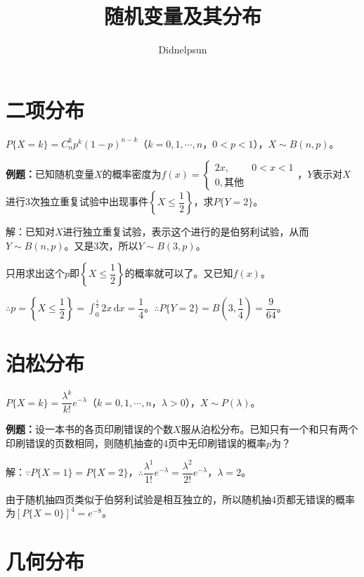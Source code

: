\documentclass[UTF8, 12pt]{ctexart}
\author{Didnelpsun}
\title{随机变量及其分布}
\date{}
\begin{document}
\maketitle
\pagestyle{empty}
\thispagestyle{empty}
\tableofcontents
\thispagestyle{empty}
\newpage
\pagestyle{plain}
\setcounter{page}{1}

\section{二项分布}

$P\{X=k\}=C_n^kp^k(1-p)^{n-k}$（$k=0,1,\cdots,n$，$0<p<1$），$X\sim B(n,p)$。

\textbf{例题：}已知随机变量$X$的概率密度为$f(x)=\left\{\begin{array}{ll}
    2x, & 0<x<1 \\
    0, \text{其他}
\end{array}\right.$，$Y$表示对$X$进行3次独立重复试验中出现事件$\left\{X\leqslant\dfrac{1}{2}\right\}$，求$P\{Y=2\}$。\medskip

解：已知对$X$进行独立重复试验，表示这个进行的是伯努利试验，从而$Y\sim B(n,p)$。又是3次，所以$Y\sim B(3,p)$。

只用求出这个$p$即$\left\{X\leqslant\dfrac{1}{2}\right\}$的概率就可以了。又已知$f(x)$。

$\therefore p=\left\{X\leqslant\dfrac{1}{2}\right\}=\int_0^\frac{1}{2}2x\,\textrm{d}x=\dfrac{1}{4}$。$\therefore P\{Y=2\}=B\left(3,\dfrac{1}{4}\right)=\dfrac{9}{64}$。

\section{泊松分布}

$P\{X=k\}=\dfrac{\lambda^k}{k!}e^{-\lambda}$（$k=0,1,\cdots,n$，$\lambda>0$），$X\sim P(\lambda)$。

\textbf{例题：}设一本书的各页印刷错误的个数$X$服从泊松分布。已知只有一个和只有两个印刷错误的页数相同，则随机抽查的4页中无印刷错误的概率$p$为？

解：$\because P\{X=1\}=P\{X=2\}$，$\therefore\dfrac{\lambda^1}{1!}e^{-\lambda}=\dfrac{\lambda^2}{2!}e^{-\lambda}$，$\lambda=2$。

由于随机抽四页类似于伯努利试验是相互独立的，所以随机抽4页都无错误的概率为$[P\{X=0\}]^4=e^{-8}$。

\section{几何分布}
\end{document}
